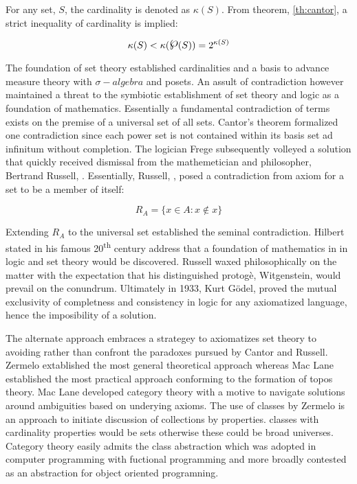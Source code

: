 \documentclass[aps,twocolumn,secnumarabic,nobalancelastpage,amsmath,amssymb,
amsthm,nofootinbib,parskip=full]{revtex4}
\numberwithin{equation}{section}
\newcommand{\pset}[1]{{\raisebox{.15\baselineskip}{\Large\ensuremath{\wp}}}(#1)}
\newcommand{\scard}[1]{\kappa(#1)}
\begin{document}
For any set, $S$, the cardinality is denoted as $\scard{S}$.
From theorem, \ref{th:cantor}, a strict inequality of cardinality
is implied:

\begin{equation}\label{eq:cantor}
  \scard{S}<\scard{\pset{S}}=2^{\scard{S}}
\end{equation}

The foundation of set theory established cardinalities and a basis
to advance measure theory with $\sigma-algebra$ and posets.
An assult of contradiction however maintained a threat to the symbiotic
establishment of set theory and logic as a foundation of
mathematics. Essentially a fundamental contradiction of terms
exists on the premise of a universal set of all sets.
Cantor's theorem formalized one contradiction since each power
set is not contained within its basis set ad infinitum without
completion. The logician Frege
subsequently volleyed a solution that quickly received dismissal
from the mathemetician and philosopher, Bertrand Russell,
\cite{russell1902}. Essentially, Russell, \cite{russell1902},
posed a contradiction from axiom for a set to be a member of itself:

\begin{equation}\label{eq:russel}
  R_A=\{x\in A: x\notin x\}
\end{equation}

Extending $R_A$ to the universal set established the seminal contradiction.
Hilbert stated in his famous 20\textsuperscript{th}
century address that a foundation of mathematics in in
logic and set theory would be discovered.
Russell waxed philosophically
on the matter with the expectation that his distinguished protog\`{e},
Witgenstein, would prevail on the conundrum.
Ultimately in 1933, Kurt G\"{o}del,
proved the mutual exclusivity of completness and consistency in
logic for any axiomatized language, hence the imposibility of a solution.

The alternate approach embraces a strategey to
axiomatizes set theory to avoiding rather than confront
the paradoxes pursued by Cantor and Russell.
Zermelo extablished the most general theoretical approach
whereas Mac Lane established the most practical approach
conforming to the formation of topos theory. Mac Lane
developed category theory with a motive to navigate
solutions around ambiguities based on underying axioms.
The use of classes by Zermelo is an approach to initiate
discussion of collections by properties. classes with
cardinality properties would be sets otherwise
these could be broad universes. Category theory
easily admits the class abstraction which was
adopted in computer programming with
fuctional programming and more broadly
contested as an abstraction
for object oriented programning.
\end{document}
